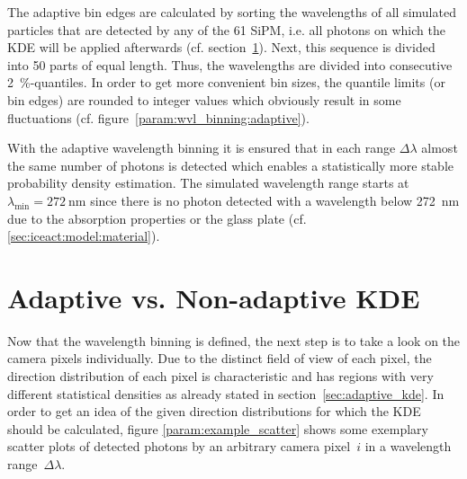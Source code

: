 The adaptive bin edges are calculated by sorting the wavelengths of all simulated particles that are detected by any of the 61 SiPM, i.e. all photons on which the KDE will be applied afterwards (cf. section~\ref{sec:adaptive_vs_nonadaptive}). Next, this sequence is divided into \num{50} parts of equal length. Thus, the wavelengths are divided into consecutive \SI{2}{\percent}-quantiles. In order to get more convenient bin sizes, the quantile limits (or bin edges) are rounded to integer values which obviously result in some fluctuations (cf. figure~\ref{param:wvl_binning:adaptive}).

With the adaptive wavelength binning it is ensured that in each range $\Delta\lambda$ almost the same number of photons is detected which enables a statistically more stable probability density estimation. The simulated wavelength range starts at $\lambda_\text{min}=\SI{272}{\nano\meter}$ since there is no photon detected with a wavelength below \SI{272}{\nano\meter} due to the absorption properties or the glass plate (cf. \ref{sec:iceact:model:material}).

\section{Adaptive vs. Non-adaptive KDE}\label{sec:adaptive_vs_nonadaptive}

Now that the wavelength binning is defined, the next step is to take a look on the camera pixels individually. Due to the distinct field of view of each pixel, the direction distribution of each pixel is characteristic and has regions with very different statistical densities as already stated in section~\ref{sec:adaptive_kde}. In order to get an idea of the given direction distributions for which the KDE should be calculated, figure \ref{param:example_scatter} shows some exemplary scatter plots of detected photons by an arbitrary camera pixel~$i$ in a wavelength range~$\Delta\lambda$.\\


